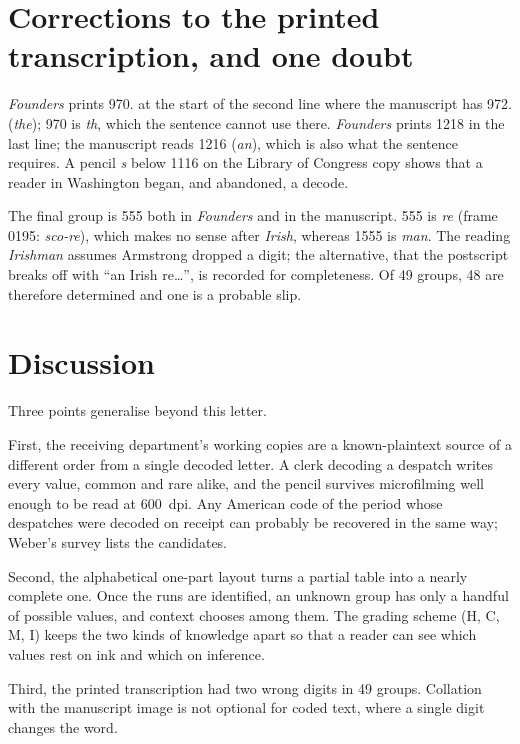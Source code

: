 \documentclass[11pt]{article}
\newcommand{\grp}[1]{\textsf{#1}}
\begin{document}
\section{Corrections to the printed transcription, and one doubt}\label{sec:corr}

\emph{Founders} prints \grp{970.} at the start of the second line where the manuscript has \grp{972.} (\emph{the}); \grp{970} is \emph{th}, which the sentence cannot use there. \emph{Founders} prints \grp{1218} in the last line; the manuscript reads \grp{1216} (\emph{an}), which is also what the sentence requires. A pencil \emph{s} below \grp{1116} on the Library of Congress copy shows that a reader in Washington began, and abandoned, a decode.

The final group is \grp{555} both in \emph{Founders} and in the manuscript. \grp{555} is \emph{re} (frame 0195: \emph{sco-re}), which makes no sense after \emph{Irish}, whereas \grp{1555} is \emph{man}. The reading \emph{Irishman} assumes Armstrong dropped a digit; the alternative, that the postscript breaks off with ``an Irish re\ldots'', is recorded for completeness. Of 49 groups, 48 are therefore determined and one is a probable slip.

\section{Discussion}\label{sec:disc}

Three points generalise beyond this letter.

First, the receiving department's working copies are a known-plaintext source of a different order from a single decoded letter. A clerk decoding a despatch writes every value, common and rare alike, and the pencil survives microfilming well enough to be read at 600~dpi. Any American code of the period whose despatches were decoded on receipt can probably be recovered in the same way; Weber's survey  lists the candidates.

Second, the alphabetical one-part layout turns a partial table into a nearly complete one. Once the runs are identified, an unknown group has only a handful of possible values, and context chooses among them. The grading scheme (H, C, M, I) keeps the two kinds of knowledge apart so that a reader can see which values rest on ink and which on inference.

Third, the printed transcription had two wrong digits in 49 groups. Collation with the manuscript image is not optional for coded text, where a single digit changes the word.
\end{document}

